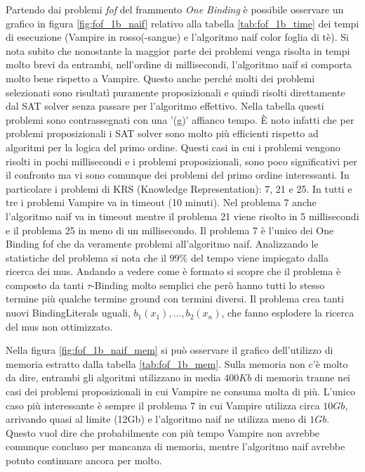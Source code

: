 \documentclass[./main.tex]{subfiles}
\begin{document}
Partendo dai problemi \textit{fof} del frammento \textit{One Binding} è possibile osservare un grafico in figura \ref{fig:fof_1b_naif}
relativo alla tabella \ref{tab:fof_1b_time} dei tempi di esecuzione (Vampire in rosso(-sangue) e l'algoritmo naif color foglia di tè). 
Si nota subito che nonostante la maggior parte dei problemi venga risolta in tempi molto brevi da entrambi, 
nell'ordine di millisecondi, l'algoritmo naif si comporta molto bene rispetto a Vampire.
Questo anche perché molti dei problemi selezionati sono risultatì puramente proposizionali e quindi risolti direttamente dal SAT solver
senza passare per l'algoritmo effettivo.
Nella tabella questi problemi sono contrassegnati con una '(g)' affianco tempo.
È noto infatti che per problemi proposizionali i SAT solver sono molto più efficienti rispetto ad algoritmi per la logica del primo ordine.
Questi casi in cui i problemi vengono risolti in pochi millisecondi e i problemi proposizionali,
sono poco significativi per il confronto ma vi sono comunque dei problemi del primo ordine interessanti.
In particolare i problemi di KRS (Knowledge Representation): 7, 21 e 25.
In tutti e tre i problemi Vampire va in timeout (10 minuti).
Nel problema 7 anche l'algoritmo naif va in timeout
mentre il problema 21 viene risolto in 5 millisecondi e il problema 25 in meno di un millisecondo.
Il problema 7 è l'unico dei One Binding fof che da veramente problemi all'algoritmo naif.
Analizzando le statistiche del problema si nota che il $99\%$ del tempo viene impiegato dalla ricerca 
dei mus. 
Andando a vedere come è formato si scopre che il problema è composto da tanti $\tau$-Binding 
molto semplici che però hanno tutti lo stesso termine più qualche termine ground con termini diversi.
Il problema crea tanti nuovi BindingLiterals uguali, $b_1(x_1), ..., b_2(x_n)$, che fanno esplodere la ricerca del mus non ottimizzato.

Nella figura \ref{fig:fof_1b_naif_mem} si può osservare il grafico dell'utilizzo di memoria estratto dalla tabella \ref{tab:fof_1b_mem}.
Sulla memoria non c'è molto da dire, entrambi gli algoritmi utilizzano in media $400Kb$ di memoria tranne nei casi
dei problemi proposizionali in cui Vampire ne consuma molta di più. 
L'unico caso più interessante è sempre il problema 7 in cui Vampire utilizza circa $10Gb$, 
arrivando quasi al limite (12Gb) e l'algoritmo naif ne utilizza meno di $1Gb$.
Questo vuol dire che probabilmente con più tempo Vampire non avrebbe comunque concluso 
per mancanza di memoria, mentre l'algoritmo naif avrebbe potuto continuare ancora per molto.
\end{document}
